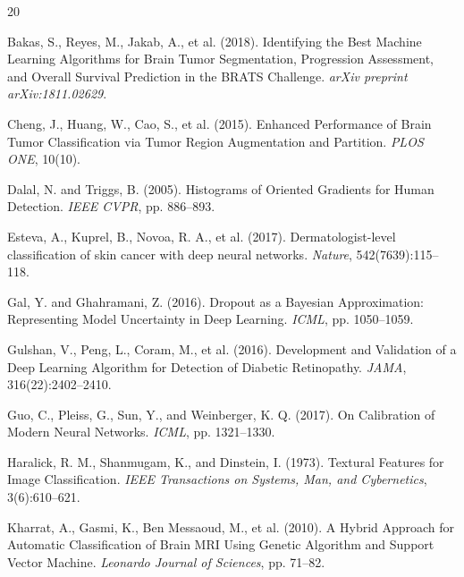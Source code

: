 \documentclass[12pt,a4paper]{article}
\begin{document}
\newpage

\begin{thebibliography}{20}

Bakas, S., Reyes, M., Jakab, A., et al. (2018).
\newblock Identifying the Best Machine Learning Algorithms for Brain Tumor Segmentation, Progression Assessment, and Overall Survival Prediction in the BRATS Challenge.
\newblock \textit{arXiv preprint arXiv:1811.02629}.

Cheng, J., Huang, W., Cao, S., et al. (2015).
\newblock Enhanced Performance of Brain Tumor Classification via Tumor Region Augmentation and Partition.
\newblock \textit{PLOS ONE}, 10(10).

Dalal, N. and Triggs, B. (2005).
\newblock Histograms of Oriented Gradients for Human Detection.
\newblock \textit{IEEE CVPR}, pp. 886--893.

Esteva, A., Kuprel, B., Novoa, R. A., et al. (2017).
\newblock Dermatologist-level classification of skin cancer with deep neural networks.
\newblock \textit{Nature}, 542(7639):115--118.

Gal, Y. and Ghahramani, Z. (2016).
\newblock Dropout as a Bayesian Approximation: Representing Model Uncertainty in Deep Learning.
\newblock \textit{ICML}, pp. 1050--1059.

Gulshan, V., Peng, L., Coram, M., et al. (2016).
\newblock Development and Validation of a Deep Learning Algorithm for Detection of Diabetic Retinopathy.
\newblock \textit{JAMA}, 316(22):2402--2410.

Guo, C., Pleiss, G., Sun, Y., and Weinberger, K. Q. (2017).
\newblock On Calibration of Modern Neural Networks.
\newblock \textit{ICML}, pp. 1321--1330.

Haralick, R. M., Shanmugam, K., and Dinstein, I. (1973).
\newblock Textural Features for Image Classification.
\newblock \textit{IEEE Transactions on Systems, Man, and Cybernetics}, 3(6):610--621.

Kharrat, A., Gasmi, K., Ben Messaoud, M., et al. (2010).
\newblock A Hybrid Approach for Automatic Classification of Brain MRI Using Genetic Algorithm and Support Vector Machine.
\newblock \textit{Leonardo Journal of Sciences}, pp. 71--82.


\end{thebibliography}
\end{document}
